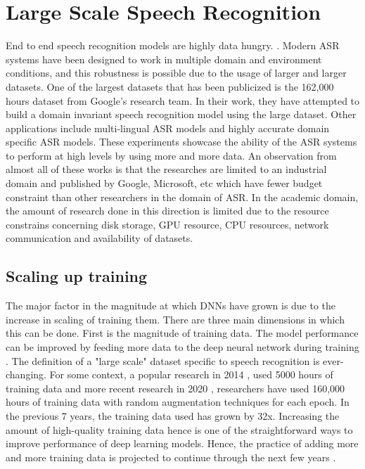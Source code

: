 \chapter{Large Scale Speech Recognition}
\label{chapter:largescale}

End to end speech recognition models are highly data hungry. \cite{Li2020OnRecognition}. Modern ASR systems have been designed to work in multiple domain and environment conditions, and this robustness is possible due to the usage of larger and larger datasets. One of the largest datasets that has been publicized is the 162,000 hours dataset from Google's research team. In their work, they have attempted to build a domain invariant speech recognition model using the large dataset\cite{Narayanan2019TowardTraining}. Other applications include multi-lingual ASR models \cite{Kannan2019Large-ScaleModel} and highly accurate domain specific ASR models. These experiments showcase the ability of the ASR systems to perform at high levels by using more and more data. An observation from almost all of these works is that the researches are limited to an industrial domain and published by Google, Microsoft, etc which have fewer budget constraint than other researchers in the domain of ASR. In the academic domain, the amount of research done in this direction is limited due to the resource constrains concerning disk storage, GPU resource, CPU resources, network communication and availability of datasets. 

\section{Scaling up training}
The major factor in the magnitude at which DNNs have grown is due to the increase in scaling of training them. There are three main dimensions in which this can be done. First is the magnitude of training data. The model performance can be improved by feeding more data to the deep neural network during training \cite{HestnessDEEPEMPIRICALLY}. The definition of a "large scale" dataset specific to speech recognition is ever-changing. For some context, a popular research in 2014 \cite{Hannun2014DeepRecognition}, used 5000 hours of training data and more recent research in 2020 \cite{Li2020OnRecognition}, researchers have used 160,000 hours of training data with random augmentation techniques for each epoch. In the previous 7 years, the training data used has grown by 32x. Increasing the amount of high-quality training data hence is one of the straightforward ways to improve performance of deep learning models. Hence, the practice of adding more and more training data is projected to continue through the next few years \cite{Mayer2020ScalableInfrastructures}. 

